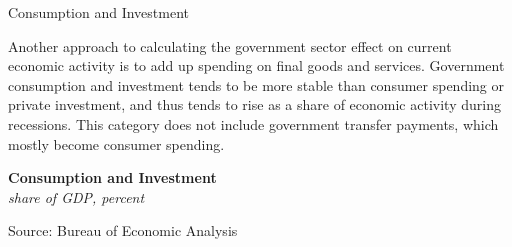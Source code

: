 \documentclass{report}
\makeatletter
\newcommand{\tbllink}[1]{\href{https://raw.githubusercontent.com/bdecon/US-chartbook/master/chartbook/data/#1}{\faTable}}
\newcommand*\short[1]{\expandafter\@gobbletwo\number\numexpr#1\relax}
\newcommand{\stdnode}[3]{\node[below, align=left, shift=({#1,#2})]{#3};}
\newcommand{\shdateaxisticks}{
		date coordinates in=x, axis line style={draw=none},
		xmax={2024-01-31},
		max space between ticks=40,	    
		xtick={{1990-01-01}, {1995-01-01}, {2000-01-01}, 
			{2005-01-01}, {2010-01-01}, {2015-01-01}, {2020-01-01}},
		minor xtick={},
		enlarge y limits={0.06}, enlarge x limits={0.01},
		xticklabel style={align=center, yshift=-2pt}, tick label style={inner sep=0pt},
		}
\newcommand{\bbar}[2]{extra #1 ticks = {{#2}}, extra #1 tick labels = ,
		extra #1 tick style = {grid=major, grid style={thick, black!25}},}
\newcommand{\stdline}[4]{\addplot[very thick, no markers, color=#1] 
		table [x=#2, y=#3, col sep=comma] {#4};	}
\newcommand{\rbars}{
		\fill[color=black!10] (axis cs:{1990-07-01},\pgfkeysvalueof{/pgfplots/ymin})
			rectangle (axis cs:{1991-03-01}, \pgfkeysvalueof{/pgfplots/ymax});
		\fill[color=black!10] (axis cs:{2007-12-01},\pgfkeysvalueof{/pgfplots/ymin})
			rectangle (axis cs:{2009-07-01}, \pgfkeysvalueof{/pgfplots/ymax});
		\fill[color=black!10] (axis cs:{2001-03-01},\pgfkeysvalueof{/pgfplots/ymin})
			rectangle (axis cs:{2001-11-01}, \pgfkeysvalueof{/pgfplots/ymax});
		\fill[color=black!10] (axis cs:{2020-02-01},\pgfkeysvalueof{/pgfplots/ymin})
			rectangle (axis cs:{2020-05-01}, \pgfkeysvalueof{/pgfplots/ymax});}
\makeatother
\begin{document}
{\begin{minipage}{1.0\textwidth}
\normalsize Consumption and Investment
\vspace{-1mm}

\small Another approach to calculating the government sector effect on current economic activity is to add up spending on final goods and services. Government consumption and investment tends to be more stable than consumer spending or private investment, and thus tends to rise as a share of economic activity during recessions. This category does not include government transfer payments, which mostly become consumer spending.
\end{minipage}
\vspace{1mm}

\begin{minipage}{0.38\textwidth}
\normalsize \textbf{Consumption and Investment}\\
\footnotesize{\textit{share of GDP, percent}}
\vspace{3.7cm}

\hspace{2mm} 

\footnotesize{Source: Bureau of Economic Analysis} \hfill \tbllink{govci.csv}
\end{minipage}\hspace{5mm}
\begin{minipage}{0.34\textwidth}
\small 
\end{minipage}
\newpage
\hypertarget{govco}{\label{govco}}  
\begin{minipage}{1.0\textwidth}   

\end{minipage}}
\end{document}
